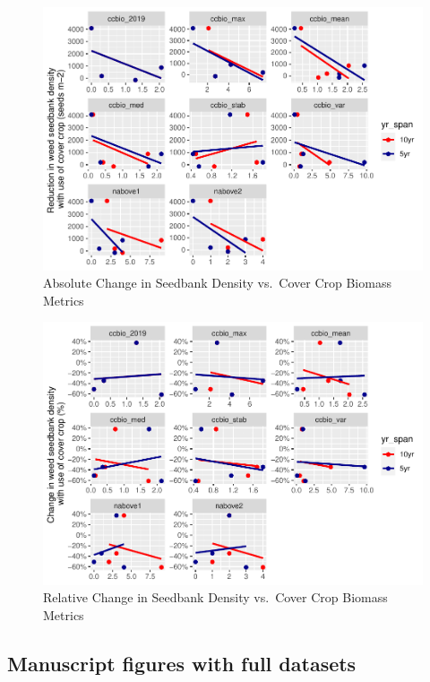 \documentclass[
]{article}
\begin{document}
\begin{figure}
\centering
\includegraphics{supp-mat_files/figure-latex/unnamed-chunk-1-1.pdf}
\caption{Absolute Change in Seedbank Density vs.~Cover Crop Biomass
Metrics}
\end{figure}

\begin{figure}
\centering
\includegraphics{supp-mat_files/figure-latex/unnamed-chunk-2-1.pdf}
\caption{Relative Change in Seedbank Density vs.~Cover Crop Biomass
Metrics}
\end{figure}

\newpage

\hypertarget{manuscript-figures-with-full-datasets}{%
\subsection{Manuscript figures with full
datasets}\label{manuscript-figures-with-full-datasets}}
\end{document}
